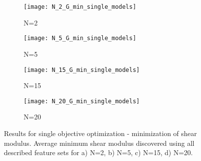 \documentclass[preprint,amsmath,amssymb,aps, prb,showkeys]{revtex4-1}
\begin{document}
\begin{figure}[htp]
        \parbox{.975\textwidth}{
            \begin{subfigure}{.475\linewidth}
                \texttt{[image: N\_2\_G\_min\_single\_models]}
                \caption{N=2}
                \label{fig:Min_G_N_2_single_models}
        \end{subfigure}
        	\begin{subfigure}{.475\linewidth}
                \texttt{[image: N\_5\_G\_min\_single\_models]}
                \caption{N=5}
                \label{fig:Min_G_N_5_single_models}
        \end{subfigure}
        	\begin{subfigure}{.475\linewidth}
                \texttt{[image: N\_15\_G\_min\_single\_models]}
                \caption{N=15}
                \label{fig:Min_G_N_15_single_models}
        \end{subfigure}
        	\begin{subfigure}{.475\linewidth}
                \texttt{[image: N\_20\_G\_min\_single\_models]}
                \caption{N=20}
                \label{fig:Min_G_N_20_single_models}
        \end{subfigure}
        }
        \caption{ Results for single objective optimization - minimization of shear modulus. Average minimum shear modulus discovered using all described feature sets for a) N=2, b) N=5, c) N=15, d) N=20.}
        \label{fig:min_shear_modulus_single_BMA}
         
\end{figure} 
\end{document}
